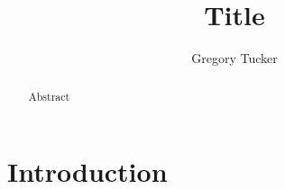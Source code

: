 \documentclass[a4paper, twocolumn, 10pt, revision]{ess}
\newcommand{\pdfsubject}{Subject}
\newcommand{\pdftitle}{Title}
\newcommand{\pdfauthor}{Gregory Tucker}
\begin{document}
\titlehead{\pdfsubject \hfill Revision: \revision}
\title{\pdftitle}
\author{\pdfauthor}
\date{\revisiondate}
\maketitle

\begin{abstract}
  Abstract
\end{abstract}

\section{Introduction}
\end{document}
